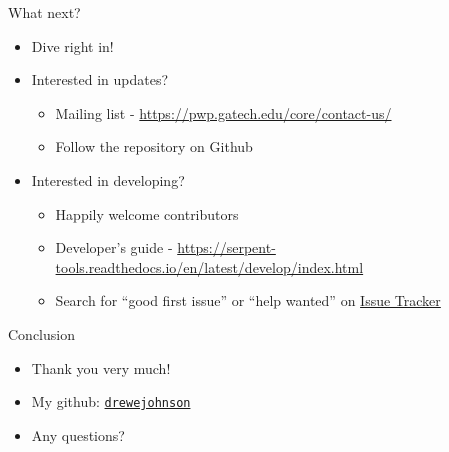 \documentclass{beamer}
\begin{document}
\begin{frame}{What next?}
    \begin{itemize}
        \item{Dive right in!}
        \item{Interested in updates?}
        \begin{itemize}
            \item{Mailing list - \url{https://pwp.gatech.edu/core/contact-us/}}
            \item{Follow the repository on Github}
        \end{itemize}
        \item{Interested in developing?}
        \begin{itemize}
            \item{Happily welcome contributors}
            \item{Developer's guide - \url{https://serpent-tools.readthedocs.io/en/latest/develop/index.html}}
            \item{Search for ``good first issue'' or ``help wanted'' on \href{https://github.com/CORE-GATECH-GROUP/serpent-tools/issues}{Issue Tracker}}
        \end{itemize}
    \end{itemize}
\end{frame}

\begin{frame}{Conclusion}
    \begin{itemize}
        \item{Thank you very much!}
        \item{My github: \href{https://github.com/drewejohnson}{\texttt{drewejohnson}}}
        \item{Any questions?}
    \end{itemize}
\end{frame}
\end{document}
